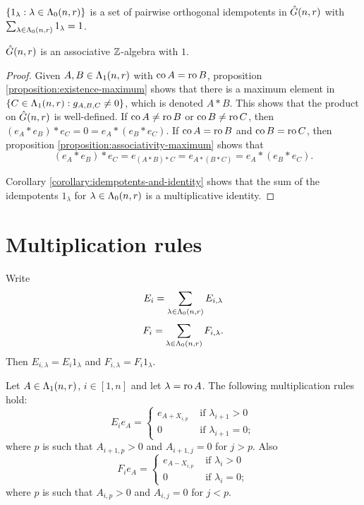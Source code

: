 \documentclass[a4paper, 11pt]{report}
\begin{document}
\begin{corollary}\label{corollary:idempotents-and-identity}
$\{1_\lambda:\lambda\in\Lambda_0(n,r)\}$ is a set of pairwise orthogonal idempotents in $\hat{G}(n,r)$ with $\sum_{\lambda\in\Lambda_0(n,r)}1_\lambda = 1$.
\end{corollary}

\begin{theorem}
$\hat{G}(n,r)$ is an associative $\mathbb{Z}$-algebra with $1$.
\end{theorem}
\begin{proof}
Given $A,B\in\Lambda_1(n,r)$ with $\operatorname{co}{A}=\operatorname{ro}{B}$, proposition \ref{proposition:existence-maximum} shows that there is a maximum element in $\{C\in\Lambda_1(n,r): g_{A,B,C}\neq 0\}$, which is denoted $A\ast B$. This shows that the product on $\hat{G}(n,r)$ is well-defined. If $\operatorname{co}{A}\neq \operatorname{ro}{B}$ or $\operatorname{co}{B}\neq \operatorname{ro}{C}$, then $(e_A\ast e_B)\ast e_C = 0 = e_A\ast (e_B\ast e_C)$. If $\operatorname{co}{A}=\operatorname{ro}{B}$ and $\operatorname{co}{B}=\operatorname{ro}{C}$, then proposition \ref{proposition:associativity-maximum} shows that
\begin{equation*}
(e_A\ast e_B)\ast e_C = e_{(A\ast B)\ast C} = e_{A\ast (B\ast C)} = e_A\ast (e_B\ast e_C).
\end{equation*}

Corollary \ref{corollary:idempotents-and-identity} shows that the sum of the idempotents $1_\lambda$ for $\lambda\in\Lambda_0(n,r)$ is a multiplicative identity.
\end{proof}

\section{Multiplication rules}

Write
\begin{equation*}
E_i = \sum_{\lambda\in\Lambda_0(n,r)} E_{i,\lambda}
\end{equation*}
\begin{equation*}
F_i = \sum_{\lambda\in\Lambda_0(n,r)} F_{i,\lambda}.
\end{equation*}
Then $E_{i,\lambda} = E_i 1_\lambda$ and $F_{i,\lambda} = F_i 1_\lambda$.

\begin{lemma}
Let $A\in\Lambda_1(n,r)$, $i\in [1,n]$ and let $\lambda = \operatorname{ro}{A}$. The following multiplication rules hold:
\begin{equation*}
E_i e_A = \begin{cases}
e_{A+X_{i,p}} &\text{	if } \lambda_{i+1}>0\\
0 &\text{	if } \lambda_{i+1}=0;
\end{cases}
\end{equation*}
where $p$ is such that $A_{i+1,p}>0$ and $A_{i+1,j}=0$ for $j>p$. Also
\begin{equation*}
F_i e_A = \begin{cases}
e_{A-X_{i,p}} &\text{	if } \lambda_i>0\\
0 &\text{	if } \lambda_i=0;
\end{cases}
\end{equation*}
where $p$ is such that $A_{i,p}>0$ and $A_{i,j}=0$ for $j<p$.
\end{lemma}
\end{document}
